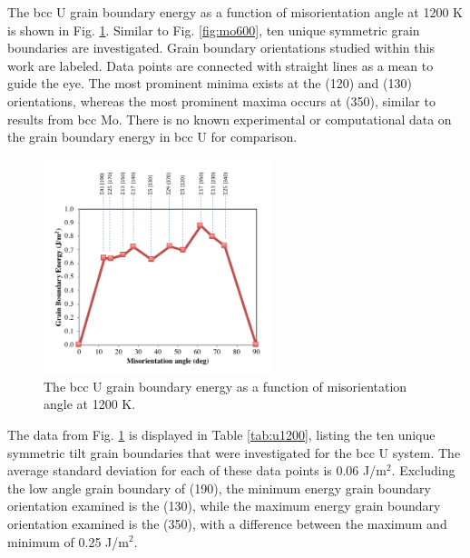 \documentclass[review]{elsarticle}
\begin{document}
The bcc U grain boundary energy as a function of misorientation angle at 1200 K is shown in Fig. \ref{fig:u1200}. Similar to Fig. \ref{fig:mo600}, ten unique symmetric grain boundaries are investigated. Grain boundary orientations studied within this work are labeled. Data points are connected with straight lines as a mean to guide the eye. The most prominent minima exists at the (120) and (130) orientations, whereas the most prominent maxima occurs at (350), similar to results from bcc Mo. There is no known experimental or computational data on the grain boundary energy in bcc U for comparison.

\begin{figure}[h]
 \centering
 \includegraphics[width=0.6\textwidth]{u1200B.png} 
 \caption{The bcc U grain boundary energy as a function of misorientation angle at 1200 K.}
 \label{fig:u1200}
\end{figure}

The data from Fig. \ref{fig:u1200} is displayed in Table \ref{tab:u1200}, listing the ten unique symmetric tilt grain boundaries that were investigated for the bcc U system. The average standard deviation for each of these data points is 0.06 J/m$^{2}$. Excluding the low angle grain boundary of (190), the minimum energy grain boundary orientation examined is the (130), while the maximum energy grain boundary orientation examined is the (350), with a difference between the maximum and minimum of 0.25 J/m$^{2}$. 
\end{document}
